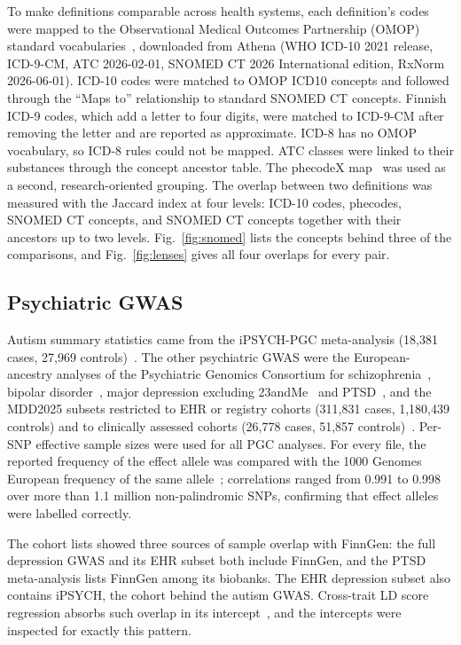 \documentclass[conference]{IEEEtran}
\begin{document}
To make definitions comparable across health systems, each definition's codes were mapped to the Observational Medical Outcomes Partnership (OMOP) standard vocabularies~\cite{hripcsak2015,overhage2012}, downloaded from Athena (WHO ICD-10 2021 release, ICD-9-CM, ATC 2026-02-01, SNOMED CT 2026 International edition, RxNorm 2026-06-01). ICD-10 codes were matched to OMOP ICD10 concepts and followed through the ``Maps to'' relationship to standard SNOMED CT concepts. Finnish ICD-9 codes, which add a letter to four digits, were matched to ICD-9-CM after removing the letter and are reported as approximate. ICD-8 has no OMOP vocabulary, so ICD-8 rules could not be mapped. ATC classes were linked to their substances through the concept ancestor table. The phecodeX map~\cite{shuey2023,wu2019} was used as a second, research-oriented grouping. The overlap between two definitions was measured with the Jaccard index at four levels: ICD-10 codes, phecodes, SNOMED CT concepts, and SNOMED CT concepts together with their ancestors up to two levels. Fig.~\ref{fig:snomed} lists the concepts behind three of the comparisons, and Fig.~\ref{fig:lenses} gives all four overlaps for every pair.

\subsection{Psychiatric GWAS}
Autism summary statistics came from the iPSYCH-PGC meta-analysis (18,381 cases, 27,969 controls)~\cite{grove2019}. The other psychiatric GWAS were the European-ancestry analyses of the Psychiatric Genomics Consortium for schizophrenia~\cite{trubetskoy2022}, bipolar disorder~\cite{mullins2021}, major depression excluding 23andMe~\cite{adams2025} and PTSD~\cite{nievergelt2024}, and the MDD2025 subsets restricted to EHR or registry cohorts (311,831 cases, 1,180,439 controls) and to clinically assessed cohorts (26,778 cases, 51,857 controls)~\cite{adams2025}. Per-SNP effective sample sizes were used for all PGC analyses. For every file, the reported frequency of the effect allele was compared with the 1000 Genomes European frequency of the same allele~\cite{kg2015}; correlations ranged from 0.991 to 0.998 over more than 1.1 million non-palindromic SNPs, confirming that effect alleles were labelled correctly.

The cohort lists showed three sources of sample overlap with FinnGen: the full depression GWAS and its EHR subset both include FinnGen, and the PTSD meta-analysis lists FinnGen among its biobanks. The EHR depression subset also contains iPSYCH, the cohort behind the autism GWAS. Cross-trait LD score regression absorbs such overlap in its intercept~\cite{bulik2015atlas}, and the intercepts were inspected for exactly this pattern.
\end{document}

